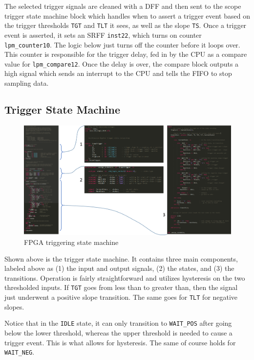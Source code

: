 The selected trigger signals are cleaned with a DFF and then sent to the scope trigger state machine block which handles when to assert a trigger event based on the trigger thresholds \verb=TGT= and \verb=TLT= it sees, as well as the slope \verb=TS=. Once a trigger event is asserted, it sets an SRFF \verb=inst22=, which turns on counter \verb=lpm_counter10=. The logic below just turns off the counter before it loops over. This counter is responsible for the trigger delay, fed in by the CPU as a compare value for \verb=lpm_compare12=. Once the delay is over, the compare block outputs a high signal which sends an interrupt to the CPU and tells the FIFO to stop sampling data.

\subsection{Trigger State Machine}

\begin{figure}[ht!]
    \centering
    \includegraphics[width=6in]{fpga_logic/vhdl/triggering.png}
		\caption{FPGA triggering state machine}
\end{figure}

Shown above is the trigger state machine. It contains three main components, labeled above as (1) the input and output signals, (2) the states, and (3) the transitions. Operation is fairly straightforward and utilizes hysteresis on the two thresholded inputs. If \verb=TGT= goes from less than to greater than, then the signal just underwent a positive slope transition. The same goes for \verb=TLT= for negative slopes.

Notice that in the \verb=IDLE= state, it can only transition to \verb=WAIT_POS= after going below the lower threshold, whereas the upper threshold is needed to cause a trigger event. This is what allows for hysteresis. The same of course holds for \verb=WAIT_NEG=.

